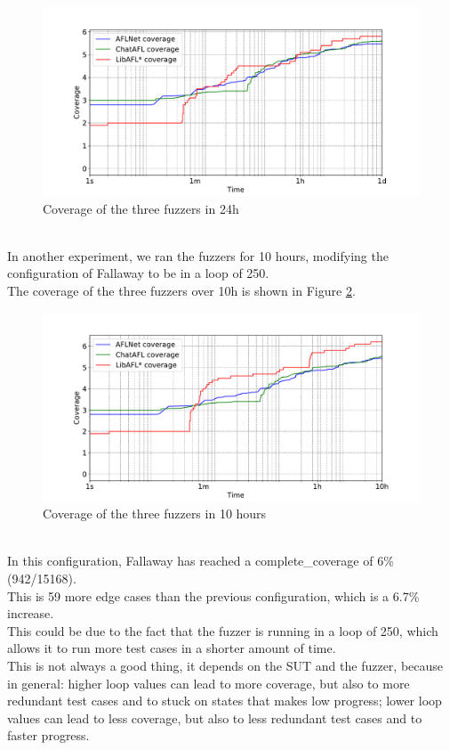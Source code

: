 \begin{figure}[H]
    \centering
    \includegraphics[width=1\textwidth]{Images/coverage_over_time_lighttpd-1day.pdf}
    \caption{Coverage of the three fuzzers in 24h}
    \label{fig:coverage_1day}
\end{figure}
\phantom{}\\
In another experiment, we ran the fuzzers for 10 hours, modifying the configuration of Fallaway to be in a loop of 250.
\\The coverage of the three fuzzers over 10h is shown in Figure \ref{fig:coverage_10hours}.

\begin{figure}[H]
    \centering
    \includegraphics[width=1\textwidth]{Images/coverage_over_time_lighttpd-10h.pdf}
    \caption{Coverage of the three fuzzers in 10 hours}
    \label{fig:coverage_10hours}
\end{figure}
\phantom{}\\
In this configuration, Fallaway has reached a complete\_coverage of 6\% (942/15168).
\\This is 59 more edge cases than the previous configuration, which is a 6.7\% increase.
\\This could be due to the fact that the fuzzer is running in a loop of 250, which allows it to run more test cases in a shorter amount of time.
\\This is not always a good thing, it depends on the SUT and the fuzzer, because in general: higher loop values can lead to more coverage, but also to more redundant test cases and to stuck on states that makes low progress; lower loop values can lead to less coverage, but also to less redundant test cases and to faster progress.